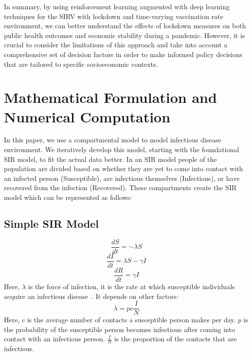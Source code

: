 \documentclass[tikz,fleqn,12pt]{wlscirep}
\begin{document}
In summary, by using reinforcement learning augmented with deep learning techniques for the SIRV with lockdown and time-varying vaccination rate environment, we can better understand the effects of lockdown measures on both public health outcomes and economic stability during a pandemic. However, it is crucial to consider the limitations of this approach and take into account a comprehensive set of decision factors in order to make informed policy decisions that are tailored to specific socioeconomic contexts.

\section{Mathematical Formulation and Numerical Computation}
In this paper, we use a compartmental model to model infectious disease environment. We iteratively develop this model, starting with the foundational SIR model, to fit the actual data better. In an SIR model people of the population are divided based on whether they are yet to come into contact with an infected person (Susceptible), are infectious themselves (Infectious), or have recovered from the infection (Recovered). These compartments create the SIR model which can be represented as follows:
\subsection{Simple SIR Model}
\begin{figure}[htbp!]
\centering    
{}
\end{figure}
\begin{equation}
  \frac{d S}{d t}=-\lambda S
  \label{eq:S_without_lockdown}
\end{equation}
\begin{equation}
  \frac{d I}{d t}=\lambda S-\gamma I
  \label{eq:I_without_lockdown}
\end{equation}
\begin{equation}
  \frac{d R}{d t}=\gamma I
  \label{eq:R_without_lockdown}
\end{equation}
Here, $\lambda$ is the force of infection, it is the rate at which susceptible individuals acquire an infectious disease~\cite{hens_aerts_faes_shkedy_lejeune_vandamme_beutels_2010}. It depends on other factors:
\begin{equation}
  \lambda = pc\frac{I}{N}
  \label{eq:lambda_force_of_infection}
\end{equation}
Here, $c$ is the average number of contacts a susceptible person makes per day. $p$ is the probability of the susceptible person becomes infectious after coming into contact with an infectious person. $\frac{I}{N}$ is the proportion of the contacts that are infectious.
\end{document}
